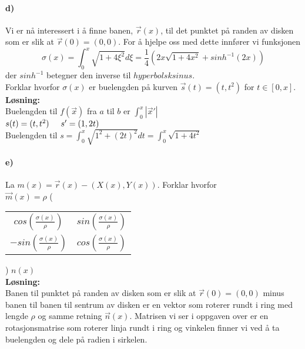 \documentclass[11pt, A4paper,norsk]{article}
\begin{document}
		\paragraph{d)}
			\begin{flushleft}
Vi er nå interessert i å finne banen, $\vec{r}(x)$, til det punktet på randen av disken som er slik at $\vec{r}(0) = (0, 0)$. For å hjelpe oss med dette innfører vi funksjonen
$$\sigma(x) = \int_{0}^{x} \sqrt{1 + 4\xi^2} d\xi = \frac{1}{4} \left(2x\sqrt{1 + 4x^2} + sinh^{-1}(2x) \right)$$ \nonumber
der $sinh^{-1}$ betegner den inverse til $hyperbolsk sinus$. \\
Forklar hvorfor $\sigma(x)$ er buelengden på kurven $\vec{s}(t) = (t, t^2)$ for $t \in [0, x]$.
\vspace{1mm}
\textbf{Løsning:} \\
\vspace{1mm}
Buelengden til $f(\vec{x})$ fra $a$ til $b$ er $\int_{0}^{x} |\vec{x}'|$ \\
$s(t) = (t, t^2) \hspace{5mm} s' = (1, 2t)$ \\
Buelengden til $s = \int_{0}^{x} \sqrt{1^2 + (2t)^2}dt = \int_{0}^{x} \sqrt{1 + 4t^2}$
			\end{flushleft}
		\paragraph{e)}
			\begin{flushleft}
La $m(x) = \vec{r}(x) - (X(x), Y(x))$. Forklar hvorfor \\
$\vec{m}(x) = \rho$
\left( \begin{tabular}{ c c }
$cos(\frac{\sigma(x)}{\rho})$ & $sin(\frac{\sigma(x)}{\rho})$ \\
$-sin(\frac{\sigma(x)}{\rho})$ & $cos(\frac{\sigma(x)}{\rho})$
\end{tabular} \right) $n(x)$ \\
\vspace{1mm}
\textbf{Løsning:} \\
\vspace{1mm}
Banen til punktet på randen av disken som er slik at $\vec{r}(0) = (0, 0)$ minus banen til banen til sentrum av disken er en vektor som roterer rundt i ring med lengde $\rho$ og samme retning $\vec{n}(x)$. Matrisen vi ser i oppgaven over er en rotasjonsmatrise som roterer linja rundt i ring og vinkelen finner vi ved å ta buelengden og dele på radien i sirkelen.
			\end{flushleft}
\end{document}
